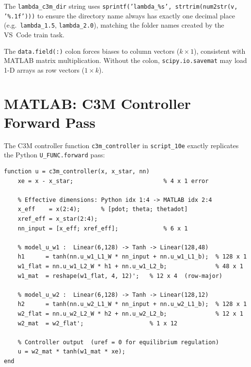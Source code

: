 \documentclass[11pt,a4paper]{article}
\begin{document}
\begin{codemath}
The \texttt{lambda\_c3m\_dir} string uses \texttt{sprintf('lambda\_\%s', strtrim(num2str(v, '\%.1f')))} to ensure the directory name always has exactly one decimal place (e.g.\ \texttt{lambda\_1.5},
\texttt{lambda\_2.0}), matching the folder names created by the VS~Code train task.

The \texttt{data.field(:)} colon forces biases to column vectors (\(k \times 1\)), consistent with MATLAB matrix multiplication. Without the colon, \texttt{scipy.io.savemat} may load 1-D arrays as row vectors (\(1 \times k\)).
\end{codemath}

\section{MATLAB: C3M Controller Forward Pass}
\label{sec:c3m_matlab_fwd}

The C3M controller function \texttt{c3m\_controller} in \texttt{script\_10e} exactly replicates the Python \texttt{U\_FUNC.forward} pass:

\begin{lstlisting}
function u = c3m_controller(x, x_star, nn)
    xe = x - x_star;                          % 4 x 1 error

    % Effective dimensions: Python idx 1:4 -> MATLAB idx 2:4
    x_eff    = x(2:4);      % [pdot; theta; thetadot]
    xref_eff = x_star(2:4);
    nn_input = [x_eff; xref_eff];             % 6 x 1

    % model_u_w1 :  Linear(6,128) -> Tanh -> Linear(128,48)
    h1      = tanh(nn.u_w1_L1_W * nn_input + nn.u_w1_L1_b);  % 128 x 1
    w1_flat = nn.u_w1_L2_W * h1 + nn.u_w1_L2_b;              % 48 x 1
    w1_mat  = reshape(w1_flat, 4, 12)';   % 12 x 4  (row-major)

    % model_u_w2 :  Linear(6,128) -> Tanh -> Linear(128,12)
    h2      = tanh(nn.u_w2_L1_W * nn_input + nn.u_w2_L1_b);  % 128 x 1
    w2_flat = nn.u_w2_L2_W * h2 + nn.u_w2_L2_b;              % 12 x 1
    w2_mat  = w2_flat';                   % 1 x 12

    % Controller output  (uref = 0 for equilibrium regulation)
    u = w2_mat * tanh(w1_mat * xe);
end
\end{lstlisting}
\end{document}
